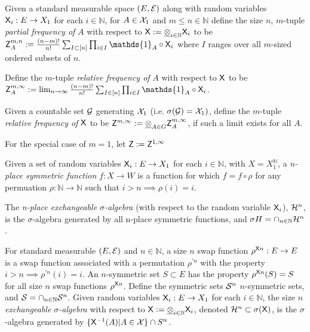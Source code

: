 
\begin{definition}\label{def:partial_freq}
Given a standard measurable space $(E,\mathcal{E})$ along with random variables $\mathsf{X}_i:E\to X_1$ for each $i\in \mathbb{N}$, for $A\in \mathcal{X}_1$ and $m\leq n\in \mathbb{N}$ define the size $n$, $m$-tuple \emph{partial frequency of} $A$ with respect to $\mathsf{X}:=\underline{\otimes}_{i\in\mathbb{N}}\mathsf{X}_i$ to be $\RV{Z}^{m,n}_A:=\frac{(n-m)!}{n!}\sum_{I\subset [n]} \prod_{i\in I} \mathds{1}_A\circ \RV{X}_i$ where $I$ ranges over all $m$-sized ordered subsets of $n$.

Define the $m$-tuple \emph{relative frequency of } $A$ with respect to $\mathsf{X}$ to be $\RV{Z}^{m,\infty}_A:= \lim_{n\to \infty}\frac{(n-m)!}{n!}\sum_{I\in [n]} \prod_{i\in I} \mathds{1}_A\circ \RV{X}_i$.

Given a countable set $\mathcal{G}$ generating $\mathcal{X}_1$ (i.e. $\sigma(\mathcal{G})=\mathcal{X}_1)$, define the $m$-tuple \emph{relative frequency of} $\mathsf{X}$ to be $\mathsf{Z}^{m,\infty}:=\underline{\otimes}_{A\in G} \mathsf{Z}^{m,\infty}_A$, if such a limit exists for all $A$.

For the special case of $m=1$, let $\mathsf{Z}:=\mathsf{Z}^{1,\infty}$
\end{definition}

\begin{definition}\label{def:exchange_sig_alb}
Given a set of random variables $\mathsf{X}_i:E\to X_1$ for each $i\in \mathbb{N}$, with $X=X_1^{\mathbb{N}}$, a \emph{n-place symmetric function} $f:X\to W$ is a function for which $f = f\circ \rho$ for any permuation $\rho:\mathbb{N}\to\mathbb{N}$ such that $i>n\implies\rho(i)=i$. 

The \emph{n-place exchangeable $\sigma$-algebra} (with respect to the random variable $\mathsf{X}_i$), $\mathcal{H}^n$, is the $\sigma$-algebra generated by all n-place symmetric functions, and $\sigma{H}=\cap_{n\in \mathbb{N}} \mathcal{H}^n$. 

For standard measurable $(E,\mathcal{E})$ and $n\in \mathbb{N}$, a size $n$ swap function $\rho^{\mathsf{X}n}:E\to E$ is a swap function associated with a permutation $\rho^{\prime n}$ with the property $i>n\implies \rho^{\prime n}(i)=i$. An $n$-symmetric set $S\subset E$ has the property $\rho^{\mathsf{X}n}(S)=S$ for all size $n$ swap functions $\rho^{\mathsf{X}n}$. Define the symmetric sets $\mathcal{S}^n$ $n$-symmetric sets, and $\mathcal{S}=\cap_{n\in\mathbb{N}} \mathcal{S}^n$. Given random variables $\mathsf{X}_i:E\to X_1$ for each $i\in\mathbb{N}$, the size $n$ \emph{exchangeable $\sigma$-algebra} with respect to $\mathsf{X}:=\underline{\otimes}_{i\in\mathbb{N}}\mathsf{X}_i$, denoted $\mathcal{H}^n\subset\sigma(\mathsf{X})$, is the $\sigma$-algebra generated by $\{\mathsf{X}^{-1}(A)|A\in\mathcal{X}\}\cap S^n$.

\end{definition}

